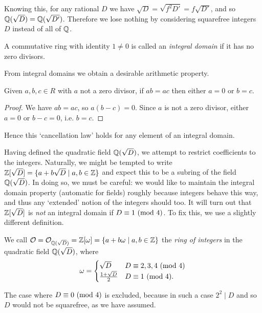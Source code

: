 Knowing this, for any rational $D$ we have $\sqrt{D}=\sqrt{f^2D'}=f\sqrt{D'}$, and so $\mathbb{Q}(\sqrt{D})=\mathbb{Q}(\sqrt{D'})$. Therefore we lose nothing by considering squarefree integers $D$ instead of all of $\mathbb{Q}$.

\begin{definition}
	A commutative ring with identity $1\neq 0$ is called an \emph{integral domain} if it has no zero divisors.
\end{definition}

From integral domains we obtain a desirable arithmetic property.

\begin{proposition}
	Given $a,b,c\in R$ with $a$ not a zero divisor, if $ab=ac$ then either $a=0$ or $b=c$.
\end{proposition}
\begin{proof}
	We have $ab=ac$, so $a(b-c)=0$. Since $a$ is not a zero divisor, either $a=0$ or $b-c=0$, i.e. $b=c$.
\end{proof}

Hence this `cancellation law' holds for any element of an integral domain.

Having defined the quadratic field $\mathbb{Q}(\sqrt{D})$, we attempt to restrict coefficients to the integers. Naturally, we might be tempted to write $\mathbb{Z}[\sqrt{D}] = \{a+b\sqrt{D} \mid a,b\in\mathbb{Z}\}$ and expect this to be a subring of the field $\mathbb{Q}(\sqrt{D})$. In doing so, we must be careful: we would like to maintain the integral domain property (automatic for fields) roughly because integers behave this way, and thus any `extended' notion of the integers should too. It will turn out that $\mathbb{Z}[\sqrt{D}]$ is \emph{not} an integral domain if $D\equiv 1 \ (\mathrm{mod}\ 4)$. To fix this, we use a slightly different definition.

\begin{definition}
	We call $\mathcal{O}=\mathcal{O}_{\mathbb{Q}(\sqrt{D})} = \mathbb{Z}[\omega] = \{a+b\omega \mid a,b\in\mathbb{Z}\}$ the \emph{ring of integers} in the quadratic field $\mathbb{Q}(\sqrt{D})$, where
	\begin{align*}
		\omega = \begin{cases}
			\sqrt{D} & D\equiv 2,3,4 \ (\mathrm{mod}\ 4)\\
			\frac{1+\sqrt{D}}{2} & D\equiv 1 \ (\mathrm{mod}\ 4).
		\end{cases}
	\end{align*}
\end{definition}

The case where $D\equiv 0 \ (\mathrm{mod}\ 4)$ is excluded, because in such a case $2^2\mid D$ and so $D$ would not be squarefree, as we have assumed.

